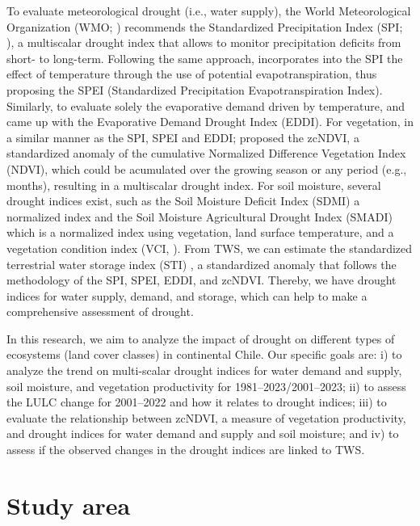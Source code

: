\documentclass[
  number,
  preprint,
  3p,
  onecolumn]{elsarticle}
\begin{document}
To evaluate meteorological drought (i.e., water supply), the World
Meteorological Organization (WMO; \citep{WMO2012}) recommends the
Standardized Precipitation Index (SPI; \citep{Mckee1993}), a multiscalar
drought index that allows to monitor precipitation deficits from short-
to long-term. Following the same approach, \citep{Vicente-Serrano2010}
incorporates into the SPI the effect of temperature through the use of
potential evapotranspiration, thus proposing the SPEI (Standardized
Precipitation Evapotranspiration Index). Similarly, to evaluate solely
the evaporative demand driven by temperature, \citep{Hobbins2016} and
\citep{McEvoy2016} came up with the Evaporative Demand Drought Index
(EDDI). For vegetation, in a similar manner as the SPI, SPEI and EDDI;
\citep{Zambrano2018} proposed the zcNDVI, a standardized anomaly of the
cumulative Normalized Difference Vegetation Index (NDVI), which could be
acumulated over the growing season or any period (e.g., months),
resulting in a multiscalar drought index. For soil moisture, several
drought indices exist, such as the Soil Moisture Deficit Index (SDMI) a
normalized index \citep{Narasimhan2005} and the Soil Moisture
Agricultural Drought Index (SMADI) \citep{Souza2021} which is a
normalized index using vegetation, land surface temperature, and a
vegetation condition index (VCI, \citep{Kogan1995}). From TWS, we can
estimate the standardized terrestrial water storage index (STI)
\citep{Cui2021}, a standardized anomaly that follows the methodology of
the SPI, SPEI, EDDI, and zcNDVI. Thereby, we have drought indices for
water supply, demand, and storage, which can help to make a
comprehensive assessment of drought.

In this research, we aim to analyze the impact of drought on different
types of ecosystems (land cover classes) in continental Chile. Our
specific goals are: i) to analyze the trend on multi-scalar drought
indices for water demand and supply, soil moisture, and vegetation
productivity for 1981--2023/2001--2023; ii) to assess the LULC change
for 2001--2022 and how it relates to drought indices; iii) to evaluate
the relationship between zcNDVI, a measure of vegetation productivity,
and drought indices for water demand and supply and soil moisture; and
iv) to assess if the observed changes in the drought indices are linked
to TWS.

\hypertarget{study-area}{%
\section{Study area}\label{study-area}}
\end{document}
